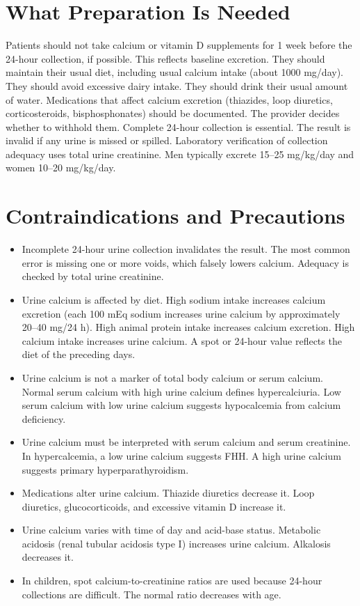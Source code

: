 \section*{What Preparation Is Needed}
Patients should not take calcium or vitamin D supplements for 1 week before the 24-hour collection, if possible. This reflects baseline excretion. They should maintain their usual diet, including usual calcium intake (about 1000 mg/day). They should avoid excessive dairy intake. They should drink their usual amount of water. Medications that affect calcium excretion (thiazides, loop diuretics, corticosteroids, bisphosphonates) should be documented. The provider decides whether to withhold them. Complete 24-hour collection is essential. The result is invalid if any urine is missed or spilled. Laboratory verification of collection adequacy uses total urine creatinine. Men typically excrete 15--25 mg/kg/day and women 10--20 mg/kg/day.

\section*{Contraindications and Precautions}
\begin{itemize}
  \item Incomplete 24-hour urine collection invalidates the result. The most common error is missing one or more voids, which falsely lowers calcium. Adequacy is checked by total urine creatinine.
  \item Urine calcium is affected by diet. High sodium intake increases calcium excretion (each 100 mEq sodium increases urine calcium by approximately 20--40 mg/24 h). High animal protein intake increases calcium excretion. High calcium intake increases urine calcium. A spot or 24-hour value reflects the diet of the preceding days.
  \item Urine calcium is not a marker of total body calcium or serum calcium. Normal serum calcium with high urine calcium defines hypercalciuria. Low serum calcium with low urine calcium suggests hypocalcemia from calcium deficiency.
  \item Urine calcium must be interpreted with serum calcium and serum creatinine. In hypercalcemia, a low urine calcium suggests FHH. A high urine calcium suggests primary hyperparathyroidism.
  \item Medications alter urine calcium. Thiazide diuretics decrease it. Loop diuretics, glucocorticoids, and excessive vitamin D increase it.
  \item Urine calcium varies with time of day and acid-base status. Metabolic acidosis (renal tubular acidosis type I) increases urine calcium. Alkalosis decreases it.
  \item In children, spot calcium-to-creatinine ratios are used because 24-hour collections are difficult. The normal ratio decreases with age.
\end{itemize}
